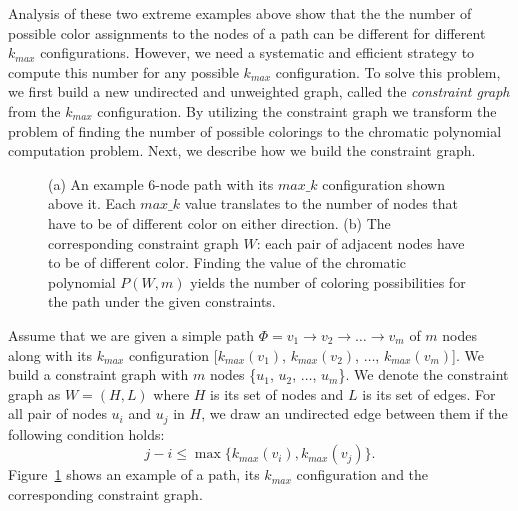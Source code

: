\documentclass{ws-procs11x85}
\newcommand{\goodgap}{
        \hspace{\subfigtopskip}
        \hspace{\subfigbottomskip}
}
\begin{document}
Analysis of these two extreme examples above show that the the number
of possible color assignments to the nodes of a path can be different
for different $k_{max}$ configurations. However, we need a systematic
and efficient strategy to compute this number for any possible
$k_{max}$ configuration.  To solve this problem, we first build a new
undirected and unweighted graph, called the {\em constraint graph}
from the $k_{max}$ configuration. By utilizing the constraint graph we
transform the problem of finding the number of possible colorings to
the chromatic polynomial computation problem. Next, we describe how we
build the constraint graph.



\begin{figure}[t]
\centering
{}
\goodgap
{}
  \caption{(a) An example 6-node path with its $max\_k$ configuration
    shown above it. Each $max\_k$ value translates to the number of
    nodes that have to be of different color on either direction. (b)
    The corresponding constraint graph $W$: each pair of adjacent
    nodes have to be of different color. Finding the value of the
    chromatic polynomial $P(W, m)$ yields the number of coloring
    possibilities for the path under the given constraints.}
  \label{maxk}
\end{figure}

Assume that we are given a simple path $\Phi = v_1 \rightarrow v_2
\rightarrow \ldots \rightarrow v_m$ of $m$ nodes along with its
$k_{max}$ configuration [$k_{max}(v_1)$, $k_{max}(v_2)$, $\ldots$,
$k_{max}(v_m)$]. We build a constraint graph with $m$ nodes \{$u_1$,
$u_2$, $\ldots$, $u_m$\}.  We denote the constraint graph as $W = (H,
L)$ where $H$ is its set of nodes and $L$ is its set of edges.  For
all pair of nodes $u_i$ and $u_j$ in $H$, we draw an undirected edge
between them if the following condition holds:
$$
j - i \leq \max\{k_{max}(v_i), k_{max}(v_j)\}.
$$
Figure~\ref{maxk} shows an example of a path, its $k_{max}$
configuration and the corresponding constraint graph.
\end{document}
